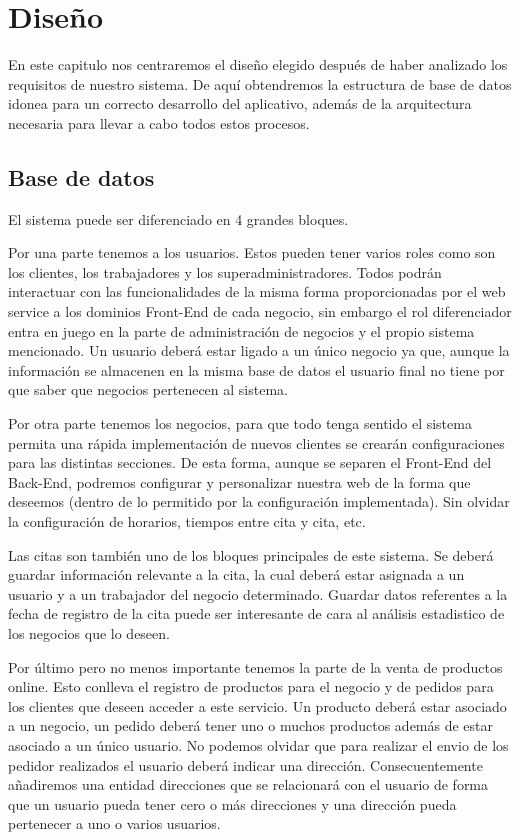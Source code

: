 \chapter{Diseño}
 En este capitulo nos centraremos el diseño elegido después de haber analizado los requisitos de nuestro sistema. De aquí obtendremos la estructura de base de datos idonea para un correcto desarrollo del aplicativo, además de la arquitectura necesaria para llevar a cabo todos estos procesos.
 
\section{Base de datos}

El sistema puede ser diferenciado en 4 grandes bloques.

Por una parte tenemos a los usuarios. Estos pueden tener varios roles como son los clientes, los trabajadores y los superadministradores. Todos podrán interactuar con las funcionalidades de la misma forma  proporcionadas por el web service a los dominios Front-End de cada negocio, sin embargo el rol diferenciador entra en juego en la parte de administración de negocios y el propio sistema mencionado. Un usuario deberá estar ligado a un único negocio ya que, aunque la información se almacenen en la misma base de datos el usuario final no tiene por que saber que negocios pertenecen al sistema.

Por otra parte tenemos los negocios, para que todo tenga sentido el sistema permita una rápida implementación de nuevos clientes se crearán configuraciones para las distintas secciones. De esta forma, aunque se separen el Front-End del Back-End, podremos configurar y personalizar nuestra web de la forma que deseemos (dentro de lo permitido por la configuración implementada). Sin olvidar la configuración de horarios, tiempos entre cita y cita, etc.

Las citas son también uno de los bloques principales de este sistema. Se deberá guardar información relevante a la cita, la cual deberá estar asignada a un usuario y a un trabajador del negocio determinado. Guardar datos referentes a la fecha de registro de la cita puede ser interesante de cara al análisis estadistico de los negocios que lo deseen.

Por último pero no menos importante tenemos la parte de la venta de productos online. Esto conlleva el registro de productos para el negocio y de pedidos para los clientes que deseen acceder a este servicio. Un producto deberá estar asociado a un negocio, un pedido deberá tener uno o muchos productos además de estar asociado a un único usuario. No podemos olvidar que para realizar el envio de los pedidor realizados el usuario deberá indicar una dirección. Consecuentemente añadiremos una entidad direcciones que se relacionará con el usuario de forma que un usuario pueda tener cero o más direcciones y una dirección pueda pertenecer a uno o varios usuarios.

